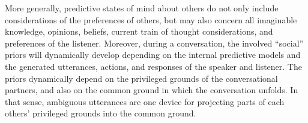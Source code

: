 \documentclass[10pt,a4paper]{article}
\begin{document}
More generally, predictive states of mind about others do not only include considerations of the preferences of others, but may also concern all imaginable knowledge, opinions, beliefs, current train of thought considerations, and preferences of the listener.
Moreover, during a conversation, the involved ``social'' priors will dynamically develop depending on the internal predictive models and the generated utterances, actions, and responses of the speaker and listener. 
The priors dynamically depend on the privileged grounds of the conversational partners, and also on the common ground in which the conversation unfolds.
In that sense, ambiguous utterances are one device for projecting parts of each others' privileged grounds into the common ground. 




\setlength{\bibleftmargin}{.125in}
\setlength{\bibindent}{-\bibleftmargin}


\end{document}
